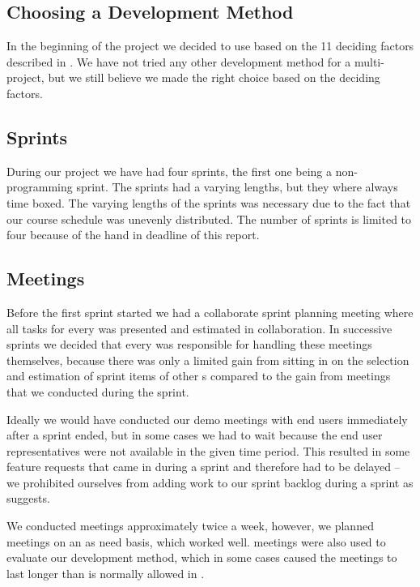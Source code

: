 \subsection{Choosing a Development Method}
In the beginning of the project we decided to use \sos{} based on the 11 deciding factors described in .
We have not tried any other development method for a multi-project, but we still believe we made the right choice based on the deciding factors.


\subsection{Sprints}
During our project we have had four sprints, the first one being a non-programming sprint.
The sprints had a varying lengths, but they where always time boxed. 
The varying lengths of the sprints was necessary due to the fact that our course schedule was unevenly distributed. 
The number of sprints is limited to four because of the hand in deadline of this report.




\subsection{Meetings}
Before the first sprint started we had a collaborate sprint planning meeting where all tasks for every \subgroup{} was presented and estimated in collaboration.
In successive sprints we decided that every \subgroup{} was responsible for handling these meetings themselves, because there was only a limited gain from sitting in on the selection and estimation of sprint items of other \subgroup{}s  compared to the gain from \sos{} meetings that we conducted during the sprint.

Ideally we would have conducted our demo meetings with end users immediately after a sprint ended, but in some cases we had to wait because the end user representatives were not available in the given time period.
This resulted in some feature requests that came in during a sprint and therefore had to be delayed -- we prohibited ourselves from adding work to our sprint backlog during a sprint as \scrum{} suggests.

We conducted \sos{} meetings approximately twice a week, however, we planned meetings on an as need basis, which worked well.
\sos{} meetings were also used to evaluate our development method, which in some cases caused the meetings to last longer than is normally allowed in \sos{}.

